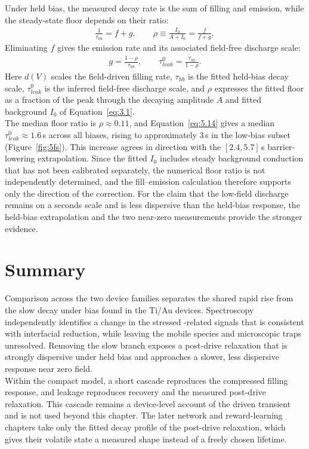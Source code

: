 \noindent Under held bias, the measured decay rate is the sum of filling and emission, while the steady-state floor
depends on their ratio:
\begin{align}
\frac{1}{\tau_{hb}} = f + g, \qquad \rho \equiv \frac{I_0}{A + I_0} = \frac{f}{f+g}, \label{eq:5.13}
\end{align}
Eliminating $f$ gives the emission rate and its associated field-free discharge scale:
\begin{align}
g = \frac{1-\rho}{\tau_{hb}}, \qquad \tau_{leak}^{0} = \frac{\tau_{hb}}{1-\rho}. \label{eq:5.14}
\end{align}
Here $d(V)$ scales the field-driven filling rate, $\tau_{hb}$ is the fitted held-bias decay scale,
$\tau_{leak}^{0}$ is the inferred field-free discharge scale, and $\rho$ expresses the fitted floor as a
fraction of the peak through the decaying amplitude $A$ and fitted background $I_0$ of
Equation~\ref{eq:3.1}.\\

\noindent The median floor ratio is $\rho\approx0.11$, and Equation~\ref{eq:5.14} gives a median
$\tau_{leak}^{0}\approx1.6$\,s across all biases, rising to approximately $3$\,s in the low-bias subset
(Figure~\ref{fig:5fs}). This increase agrees in direction with the $[2.4,5.7]$\,s barrier-lowering extrapolation.
Since the fitted $I_0$ includes steady background conduction that has not been calibrated separately, the numerical
floor ratio is not independently determined, and the fill--emission calculation therefore supports only the direction
of the correction. For the claim that the low-field discharge remains on a seconds scale and is less dispersive than
the held-bias response, the held-bias extrapolation and the two near-zero measurements provide the stronger
evidence.

\FloatBarrier
\section[Summary]{Summary}

\noindent Comparison across the two device families separates the shared rapid rise from the slow decay under bias
found in the Ti/Au devices. Spectroscopy independently identifies a change in the stressed -related
signals that is consistent with interfacial reduction, while leaving the mobile species and microscopic traps unresolved. Removing
the slow branch exposes a post-drive relaxation that is strongly dispersive under held bias and approaches a slower,
less dispersive response near zero field.\\

\noindent Within the compact model, a short cascade reproduces the compressed filling response, and leakage
reproduces recovery and the measured post-drive relaxation. This cascade remains a device-level account of the driven
transient and is not used beyond this chapter. The later network and reward-learning chapters take only the fitted
decay profile of the post-drive relaxation, which gives their volatile state a measured shape instead of a freely
chosen lifetime.
